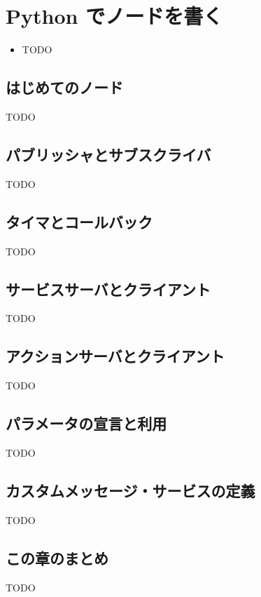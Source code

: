 \chapter{Python でノードを書く}
\label{chap:rclpy}

\begin{goalbox}
  \begin{itemize}
    \item TODO
  \end{itemize}
\end{goalbox}

\section{はじめてのノード}

TODO

\section{パブリッシャとサブスクライバ}

TODO

\section{タイマとコールバック}

TODO

\section{サービスサーバとクライアント}

TODO

\section{アクションサーバとクライアント}

TODO

\section{パラメータの宣言と利用}

TODO

\section{カスタムメッセージ・サービスの定義}

TODO

\section*{この章のまとめ}

TODO
